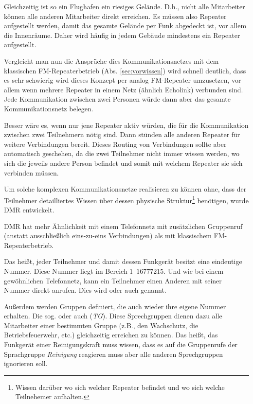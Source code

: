 Gleichzeitig ist so ein Flughafen ein riesiges Gelände. D.h., nicht alle Mitarbeiter können alle anderen Mitarbeiter direkt erreichen. Es müssen also Repeater aufgestellt werden, damit das gesamte Gelände per Funk abgedeckt ist, vor allem die Innenräume. Daher wird häufig in jedem Gebäude mindestens ein Repeater aufgestellt. 

Vergleicht man nun die Ansprüche dies Kommunikationsnetzes mit dem klassischen FM-Repeaterbetrieb (Abs. \ref{sec:vorwissen}) wird schnell deutlich, dass es sehr schwierig wird dieses Konzept per analog FM-Repeater umzusetzen, vor allem wenn mehrere Repeater in einem Netz (ähnlich Echolink) verbunden sind. Jede Kommunikation zwischen zwei Personen würde dann aber das gesamte Kommunikationsnetz belegen. 

Besser wäre es, wenn nur jene Repeater aktiv würden, die für die Kommunikation zwischen zwei Teilnehmern nötig sind. Dann stünden alle anderen Repeater für weitere Verbindungen bereit. Dieses Routing von Verbindungen sollte aber automatisch geschehen, da die zwei Teilnehmer nicht immer wissen werden, wo sich die jeweils andere Person befindet und somit mit welchem Repeater sie sich verbinden müssen. 

Um solche komplexen Kommunikationsnetze realisieren zu können ohne, dass der Teilnehmer detailliertes Wissen über dessen physische Struktur\footnote{Wissen darüber wo sich welcher Repeater befindet und wo sich welche Teilnehemer aufhalten.} benötigen, wurde DMR entwickelt.

\begin{merke}
 DMR hat mehr Ähnlichkeit mit einem Telefonnetz mit zusätzlichen Gruppenruf (anstatt ausschließlich eins-zu-eins Verbindungen) als mit klassischem FM-Repeaterbetrieb.
\end{merke} 

Das heißt, jeder Teilnehmer und damit dessen Funkgerät besitzt eine eindeutige Nummer. Diese Nummer liegt im Bereich $1$--$16777215$. Und wie bei einem gewöhnlichen Telefonnetz, kann ein Teilnehmer einen Anderen mit seiner Nummer direkt anrufen. Dies wird  oder auch  genannt.

Außerdem werden Gruppen definiert, die auch wieder ihre eigene Nummer erhalten. Die sog.  oder auch  (\emph{TG}). Diese Sprechgruppen dienen dazu alle Mitarbeiter einer bestimmten Gruppe (z.B., den Wachschutz, die Betriebsfeuerwehr, etc.) gleichzeitig erreichen zu können. Das heißt, das Funkgerät einer Reinigungskraft muss wissen, dass es auf die Gruppenrufe der Sprachgruppe \emph{Reinigung} reagieren muss aber alle anderen Sprechgruppen ignorieren soll. 

